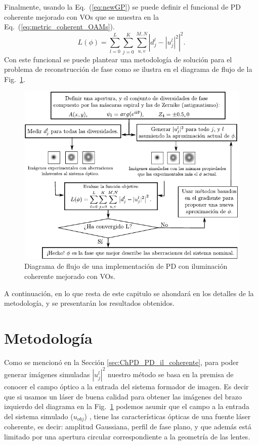 Finalmente, usando la Eq.~(\ref{eq:newGP}) se puede definir el funcional de
PD coherente mejorado con VOs que se muestra en la Eq.~(\ref{eq:metric_coherent_OAMs}). %
\begin{equation}\label{eq:metric_coherent_OAMs}
L(\phi)= \sum_{l=0}^L\sum_{j=0}^{K} \sum_{u,v}^{M,N}  \left |d_{j}^l - |u_j^l|^2 \right | ^2.
\end{equation}
Con este funcional se puede plantear una metodología de solución para
el problema de reconstrucción de fase como se ilustra en el diagrama
de flujo de la Fig.~\ref{fig:flowchart}.
\begin{figure}[h!]
\centering
\includegraphics[scale=1.2]{PDLightFlux_simple_esp.pdf}
\caption[Diagrama de flujo del PD con iluminación coherente]{Diagrama de flujo de una implementación de PD con iluminación
  coherente mejorado con VOs.}
\label{fig:flowchart}
\end{figure}
A continuación, en lo que resta de este capitulo se ahondará en los
detalles de la metodología, y se presentarán los 
resultados obtenidos.

\section{Metodología}
\label{sec:ChPD_materiales_y_metodos}
Como se mencionó en la Sección \ref{sec:ChPD_PD_il_coherente}, para
poder generar imágenes simuladas $|u_j^l|^2$ nuestro método se basa en
la premisa de conocer el campo óptico a la entrada del sistema
formador de imagen. Es decir que si usamos un láser de buena calidad
para obtener las imágenes del brazo izquierdo del diagrama en la Fig.~\ref{fig:flowchart} podemos asumir que el campo a la entrada del
sistema simulado ($u_{obj}$) 
, tiene las características
ópticas de una fuente láser coherente, es decir: amplitud Gaussiana, perfil
de fase plano, y que además está limitado por una
apertura circular correspondiente a la geometría de las lentes.  

